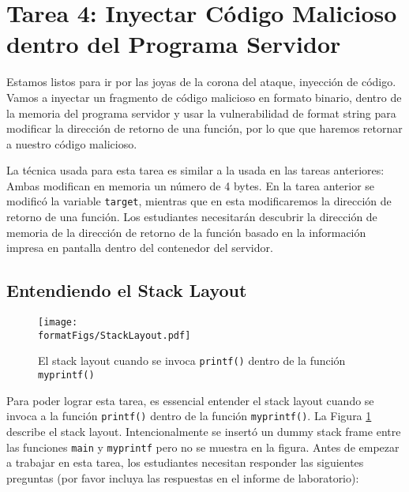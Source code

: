 \section{Tarea 4: Inyectar Código Malicioso dentro del Programa Servidor}

Estamos listos para ir por las joyas de la corona del ataque, inyección de código.
Vamos a inyectar un fragmento de código malicioso en formato binario, dentro de la memoria del programa servidor y usar la vulnerabilidad de format string para modificar la dirección de retorno de una función, por lo que que haremos retornar a nuestro código malicioso.

La técnica usada para esta tarea es similar a la usada en las tareas anteriores:
Ambas modifican en memoria un número de 4 bytes. En la tarea anterior se modificó la variable \texttt{target}, mientras que en esta modificaremos la dirección de retorno de una función. Los estudiantes necesitarán descubrir la dirección de memoria de la dirección de retorno de la función basado en la información impresa en pantalla dentro del contenedor del servidor.



\subsection{Entendiendo el Stack Layout} 

\begin{figure}[htb]
\begin{center}
\texttt{[image: \\formatFigs/StackLayout.pdf]}
\end{center}
\caption{El stack layout cuando se invoca \texttt{printf()}
dentro de la función \texttt{myprintf()}}
\label{format:fig:stacklayout}
\end{figure}

Para poder lograr esta tarea, es essencial entender el stack layout cuando se invoca a la función \texttt{printf()} dentro de la función \texttt{myprintf()}.
La Figura \ref{format:fig:stacklayout} describe el stack layout.
Intencionalmente se insertó un dummy stack frame entre las funciones \texttt{main} y \texttt{myprintf} pero no se muestra en la figura. Antes de empezar a trabajar en esta tarea, los estudiantes necesitan responder las siguientes preguntas (por favor incluya las respuestas en el informe de laboratorio):


